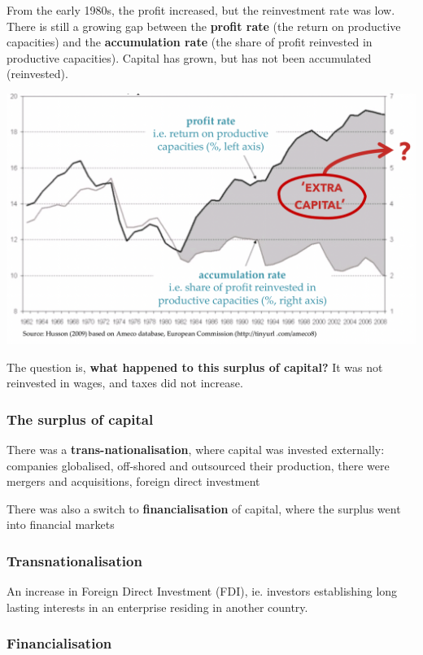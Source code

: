 \documentclass{article}
\begin{document}
From the early 1980s, the profit increased, but the reinvestment rate was low. There is still a growing gap between the \textbf{profit rate} (the return on productive capacities) and the \textbf{accumulation rate} (the share of profit reinvested in productive capacities). Capital has grown, but has not been accumulated (reinvested).

\includegraphics[width=\textwidth]{neoliberal_turn}

The question is, \textbf{what happened to this surplus of capital?} 
It was not reinvested in wages, and taxes did not increase. 

\subsubsection{The surplus of capital}

There was a \textbf{trans-nationalisation}, where capital was invested externally: companies globalised, off-shored and outsourced their production, there were mergers and acquisitions, foreign direct investment

There was also a switch to \textbf{financialisation} of capital, where the surplus went into financial markets

\subsubsection{Transnationalisation}

An increase in Foreign Direct Investment (FDI), ie.  investors establishing long lasting interests in an enterprise residing in another country. 

\subsubsection{Financialisation}
\end{document}
